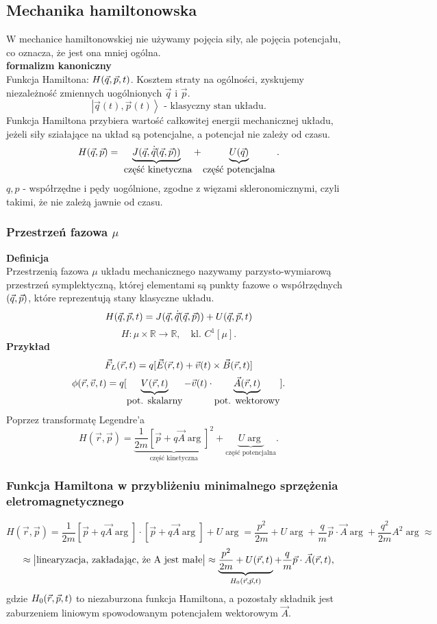 \subsection{Mechanika hamiltonowska}
W mechanice hamiltonowskiej nie używamy pojęcia siły, ale pojęcia potencjału,
co oznacza, że jest ona mniej ogólna.\\

\textbf{formalizm kanoniczny}\\
Funkcja Hamiltona: $ H(\vec{q},\vec{p},t)$. Kosztem straty na ogólności, zyskujemy 
niezależność zmiennych uogólnionych $\vec{q}$ i $\vec{p}$.\\
$$ \left| \vec{q}(t), \vec{p}(t) \right> \mbox{ - klasyczny stan układu.} $$
Funkcja Hamiltona przybiera wartość całkowitej energii mechanicznej układu, jeżeli
siły sziałające na układ są potencjalne, a potencjał nie zależy od czasu.
$$ H(\vec{q},\vec{p}) = \underbrace{J(\vec{q},\dot{\vec{q}}(\vec{q},\vec{p}))}_{\mbox{
część kinetyczna}} + \underbrace{U(\vec{q})}_{\mbox{część potencjalna}}.$$
$q,p$ - współrzędne i pędy uogólnione, zgodne z więzami skleronomicznymi, czyli takimi, że nie zależą jawnie od czasu.
\subsubsection{Przestrzeń fazowa $\mu$}
\textbf{Definicja}\\
Przestrzenią fazowa $\mu$ układu mechanicznego nazywamy parzysto-wymiarową 
przestrzeń symplektyczną, której elementami są punkty fazowe o współrzędnych 
$(\vec{q},\vec{p})$, które reprezentują stany klasyczne układu.
$$ H(\vec{q},\vec{p},t) = J(\vec{q},\dot{\vec{q}}(\vec{q},\vec{p}))+U(\vec{q},\vec{p},t) $$
$$ H:\mu \times \mathbb{R} \to \mathbb{R}, \quad \mbox{kl. } C^1[\mu]. $$
\textbf{Przykład}\\
$$ \vec{F}_L (\vec{r},t) = q[\vec{E}(\vec{r},t)+\vec{v} (t)\times\vec{B}(\vec{r},t)]$$
$$ \phi (\vec{r},\vec{v},t) = q[ \underbrace{V(\vec{r},t)}_{\mbox{pot. skalarny}}
-\vec{v} (t) \cdot \underbrace{\vec{A} (\vec{r},t) }_{\mbox{pot. wektorowy}}]. $$
Poprzez transformatę Legendre'a
$$H(\vec{r},\vec{p}) = \underbrace{\frac{1}{2m} [\vec{p}+q\vec{A}\arg ]^2}_{\mbox{
część kinetyczna}} + \underbrace{U\arg}_{\mbox{część potencjalna}}.$$
\subsubsection{Funkcja Hamiltona w przybliżeniu minimalnego sprzężenia 
eletromagnetycznego}
$$H(\vec{r},\vec{p}) = \frac{1}{2m} [\vec{p}+q\vec{A}\arg ]\cdot[\vec{p}+
q\vec{A}\arg ] + U\arg= \frac{p^2}{2m} + U\arg + \frac{q}{m}\vec{p}\cdot\vec{A}\arg
+\frac{q^2}{2m}A^2\arg \approx$$
$$\approx \big| \mbox{linearyzacja, zakładając, że A jest małe} \big| \approx
\underbrace{\frac{p^2}{2m} + U(\vec{r},t)}_{H_0(\vec{r},\vec{p},t)} + \frac{q}{m} \vec{p} \cdot \vec{A}
(\vec{r},t),$$
gdzie $H_0(\vec{r},\vec{p},t)$ to niezaburzona funkcja Hamiltona, a pozostały składnik jest 
zaburzeniem liniowym spowodowanym potencjałem wektorowym $\vec{A}$.
